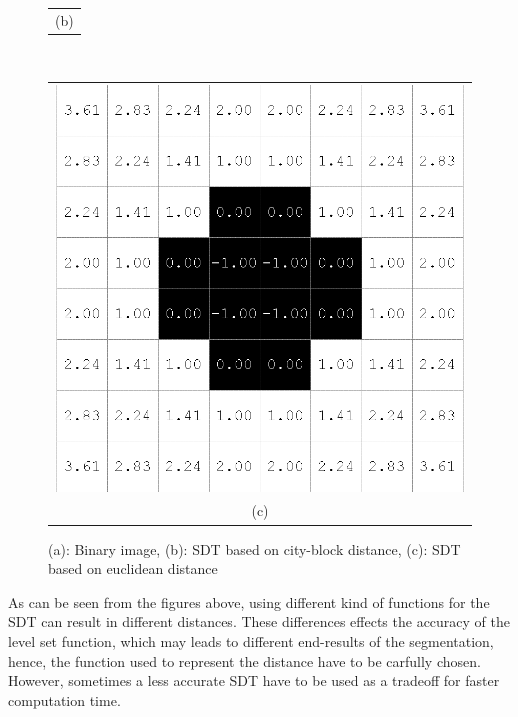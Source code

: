 \begin{figure}[h!]
\begin{minipage}{.45\textwidth}
\begin{tabular}{c}
(b)
\end{tabular}
\end{minipage}
\\
\begin{tabular}{c}
\includegraphics[width=.5\textwidth]{levelset/euclidean} \\
(c)
\end{tabular}
\caption{(a): Binary image, (b): SDT based on city-block distance, (c): SDT based on euclidean distance}
\label{SDT}
\end{figure}

As can be seen from the figures above, using different kind of functions for the SDT can result in different distances. These differences effects the accuracy of the level set function, which may leads to different end-results of the segmentation, hence, the function used to represent the distance have to be carfully chosen. However, sometimes a less accurate SDT have to be used as a tradeoff for faster computation time.

